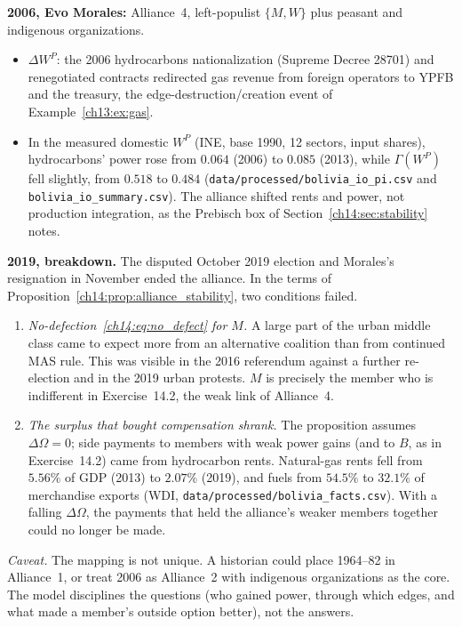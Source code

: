 \documentclass[../solutions_manual.tex]{subfiles}
\begin{document}
 \textbf{2006, Evo Morales:} Alliance~4, left-populist $\{M, W\}$ plus peasant and indigenous organizations.
\begin{itemize}
\item $\Delta W^P$: the 2006 hydrocarbons nationalization (Supreme Decree 28701) and renegotiated contracts redirected gas revenue from foreign operators to YPFB and the treasury, the edge-destruction/creation event of Example~\ref{ch13:ex:gas}.
\item In the measured domestic $W^P$ (INE, base 1990, 12 sectors, input shares), hydrocarbons' power rose from $0.064$ (2006) to $0.085$ (2013), while $\Gamma(W^P)$ fell slightly, from $0.518$ to $0.484$ (\nolinkurl{data/processed/bolivia_io_pi.csv} and \nolinkurl{bolivia_io_summary.csv}). The alliance shifted rents and power, not production integration, as the Prebisch box of Section~\ref{ch14:sec:stability} notes.
\end{itemize}

 \textbf{2019, breakdown.} The disputed October 2019 election and Morales's resignation in November ended the alliance. In the terms of Proposition~\ref{ch14:prop:alliance_stability}, two conditions failed.
\begin{enumerate}
\item \emph{No-defection~\eqref{ch14:eq:no_defect} for $M$.} A large part of the urban middle class came to expect more from an alternative coalition than from continued MAS rule. This was visible in the 2016 referendum against a further re-election and in the 2019 urban protests. $M$ is precisely the member who is indifferent in Exercise~14.2, the weak link of Alliance~4.
\item \emph{The surplus that bought compensation shrank.} The proposition assumes $\Delta\Omega = 0$; side payments to members with weak power gains (and to $B$, as in Exercise~14.2) came from hydrocarbon rents. Natural-gas rents fell from $5.56\%$ of GDP (2013) to $2.07\%$ (2019), and fuels from $54.5\%$ to $32.1\%$ of merchandise exports (WDI, \texttt{data/processed/bolivia\_facts.csv}). With a falling $\Delta\Omega$, the payments that held the alliance's weaker members together could no longer be made.
\end{enumerate}
\textit{Caveat.} The mapping is not unique. A historian could place 1964--82 in Alliance~1, or treat 2006 as Alliance~2 with indigenous organizations as the core. The model disciplines the questions (who gained power, through which edges, and what made a member's outside option better), not the answers.
\end{document}
